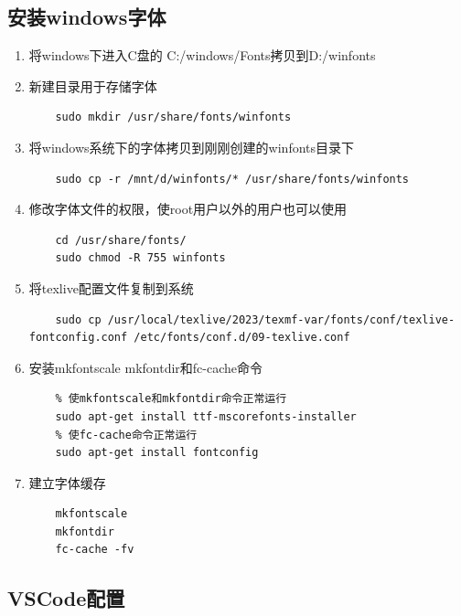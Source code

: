\subsection{安装windows字体}

\begin{enumerate}
  \item 将windows下进入C盘的 C:/windows/Fonts拷贝到D:/winfonts
  \item 新建目录用于存储字体
  
  \begin{lstlisting}
    sudo mkdir /usr/share/fonts/winfonts
  \end{lstlisting}
  \item 将windows系统下的字体拷贝到刚刚创建的winfonts目录下
  
  \begin{lstlisting}
    sudo cp -r /mnt/d/winfonts/* /usr/share/fonts/winfonts
  \end{lstlisting}
  \item 修改字体文件的权限，使root用户以外的用户也可以使用
  
  \begin{lstlisting}
    cd /usr/share/fonts/
    sudo chmod -R 755 winfonts
  \end{lstlisting}
  \item 将texlive配置文件复制到系统
  \begin{lstlisting}
    sudo cp /usr/local/texlive/2023/texmf-var/fonts/conf/texlive-fontconfig.conf /etc/fonts/conf.d/09-texlive.conf
  \end{lstlisting}
  \item 安装mkfontscale mkfontdir和fc-cache命令
  
  \begin{lstlisting}
    % 使mkfontscale和mkfontdir命令正常运行
    sudo apt-get install ttf-mscorefonts-installer
    % 使fc-cache命令正常运行
    sudo apt-get install fontconfig
  \end{lstlisting}
  \item 建立字体缓存
  
  \begin{lstlisting}
    mkfontscale
    mkfontdir
    fc-cache -fv
  \end{lstlisting}
\end{enumerate}

\subsection{VSCode配置}

